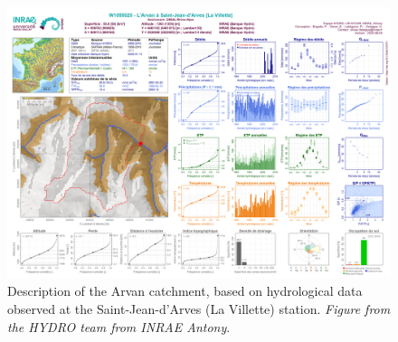 \begin{figure}
\centering
\includegraphics[width=23cm]{Figures/hydro/Figure_S1.png}
\captionsetup{justification=centering}
\caption{Description of the Arvan catchment, based on hydrological data observed at the Saint-Jean-d'Arves (La Villette) station. 
\textit{Figure from the HYDRO team from INRAE Antony}.}
\label{hydro:figA1}
\end{figure}




